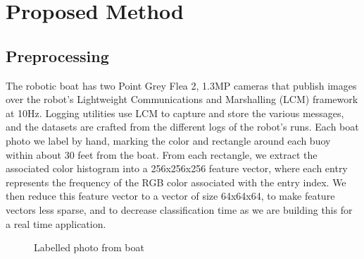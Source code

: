 \documentclass{article} %
\begin{document}
\section{Proposed Method}

\subsection{Preprocessing}
The robotic boat has two Point Grey Flea 2, 1.3MP cameras that publish images over the robot's Lightweight 
Communications and Marshalling (LCM) framework at 10Hz. Logging utilities use LCM to capture and store the various 
messages, and the datasets are crafted from the different logs of the robot's runs.
Each boat photo we label by hand, marking the color and rectangle around each buoy within about 30 feet from the boat.
From each rectangle, we extract the associated color histogram into a 256x256x256 feature vector, where each entry
represents the frequency of the RGB color associated with the entry index. We then reduce this feature vector to
a vector of size 64x64x64, to make feature vectors less sparse, and to decrease classification time as we are building
this for a real time application.

\begin{figure}[h]
\begin{center}
\end{center}
\caption{Labelled photo from boat}
\end{figure}
\end{document}
